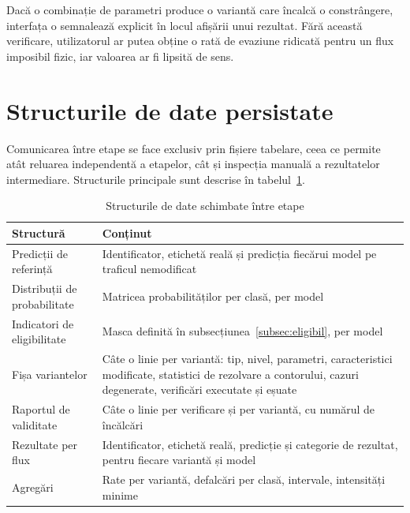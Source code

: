 Dacă o combinație de parametri produce o variantă care încalcă o constrângere, interfața o semnalează explicit în locul afișării unui rezultat. Fără această verificare, utilizatorul ar putea obține o rată de evaziune ridicată pentru un flux imposibil fizic, iar valoarea ar fi lipsită de sens.

\section{Structurile de date persistate}\label{sec:structuri}

Comunicarea între etape se face exclusiv prin fișiere tabelare, ceea ce permite atât reluarea independentă a etapelor, cât și inspecția manuală a rezultatelor intermediare. Structurile principale sunt descrise în tabelul~\ref{tab:structuri}.

\begin{table}[H]
    \caption{Structurile de date schimbate între etape}
    \centering
    \begin{tabular}{|l|p{7.4cm}|}
        \hline
        \textbf{Structură} & \textbf{Conținut} \\
        \hline
        Predicții de referință & Identificator, etichetă reală și predicția fiecărui model pe traficul nemodificat \\
        \hline
        Distribuții de probabilitate & Matricea probabilităților per clasă, per model \\
        \hline
        Indicatori de eligibilitate & Masca definită în subsecțiunea~\ref{subsec:eligibil}, per model \\
        \hline
        Fișa variantelor & Câte o linie per variantă: tip, nivel, parametri, caracteristici modificate, statistici de rezolvare a contorului, cazuri degenerate, verificări executate și eșuate \\
        \hline
        Raportul de validitate & Câte o linie per verificare și per variantă, cu numărul de încălcări \\
        \hline
        Rezultate per flux & Identificator, etichetă reală, predicție și categorie de rezultat, pentru fiecare variantă și model \\
        \hline
        Agregări & Rate per variantă, defalcări per clasă, intervale, intensități minime \\
        \hline
    \end{tabular}
    \label{tab:structuri}
\end{table}

